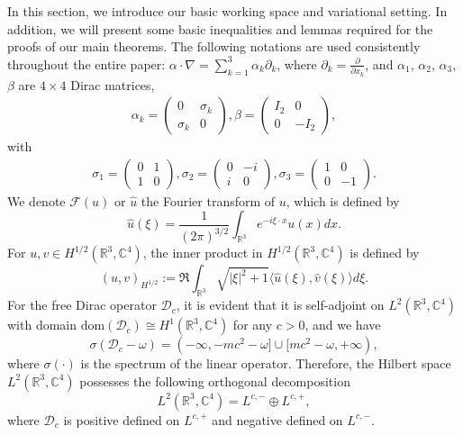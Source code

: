 \documentclass{amsart}
\theoremstyle{plain}
\theoremstyle{definition}
\theoremstyle{remark}
\numberwithin{equation}{section} \numberwithin{figure}{section}
\begin{document}
In this section, we introduce our basic working space and variational setting. In addition, we will present some basic inequalities and lemmas required for the proofs of our main theorems. The following notations are used consistently throughout the entire paper: $\alpha\cdot\nabla=\sum\limits_{k=1}^3 \alpha_k\partial_k$, where $\partial_k=\frac{\partial}{\partial x_k}$,
and  $\alpha_1$, $\alpha_2$, $\alpha_3$, $\beta$ are $4\times 4$ Dirac matrices,
 \begin{align*}
\alpha_k=\begin{pmatrix}
0 &\sigma_k\\
\sigma_k &0
\end{pmatrix},\beta=\begin{pmatrix}
I_2 &0\\
0 &-I_2
\end{pmatrix},
\end{align*}
with
\begin{align*}
\sigma_1=\begin{pmatrix}
0 &1\\
1&0
\end{pmatrix}, \sigma_2=\begin{pmatrix}
0 &-i\\
i&0
\end{pmatrix}, \sigma_3=\begin{pmatrix}
1&0\\
0&-1
\end{pmatrix}.
\end{align*}
We denote $\mathcal{F}(u)$ or $\hat{u}$ the Fourier transform of $u$, which is defined by
$$
\hat{u}(\xi)=\frac{1}{(2 \pi)^{3/2}} \int_{\mathbb{R}^3} e^{-i \xi \cdot x} u(x) d x .
$$
For $u, v\in  H^{1/2}(\mathbb{R}^3,\mathbb{C}^4)$, the inner product in $H^{1/2}(\mathbb{R}^3,\mathbb{C}^4)$  is defined by
$$
(u, v)_{H^{1/2}}:=\Re \int_{\mathbb{R}^3} \sqrt{|\xi|^2+1}\langle\hat{u}(\xi), \hat{v}(\xi)\rangle d \xi.
 $$
For the free Dirac operator $
\mathscr{D}_c 
$, 
it is evident that it is self-adjoint on $L^2(\mathbb{R}^3,\mathbb{C}^4)$ with domain $\text{dom}(\mathscr{D}_c)\cong H^{1}(\mathbb{R}^3,\mathbb{C}^4)$ for any $c>0$, and we have
$$\sigma(\mathscr{D}_c-\omega)=(-\infty,-mc^2-\omega]\cup[mc^2-\omega,+\infty),$$  where $\sigma(\cdot)$ is the spectrum
of the linear operator.
Therefore, the Hilbert space $L^2(\mathbb{R}^3, \mathbb{C}^4)$ possesses the following orthogonal decomposition
$$
L^2(\mathbb{R}^3,\mathbb{C}^4)=L^{c, -}\oplus L^{c, +},
$$
where $\mathscr{D}_c$ is positive defined on $L^{c, +}$ and negative defined on $L^{c, -}$. %
\end{document}
